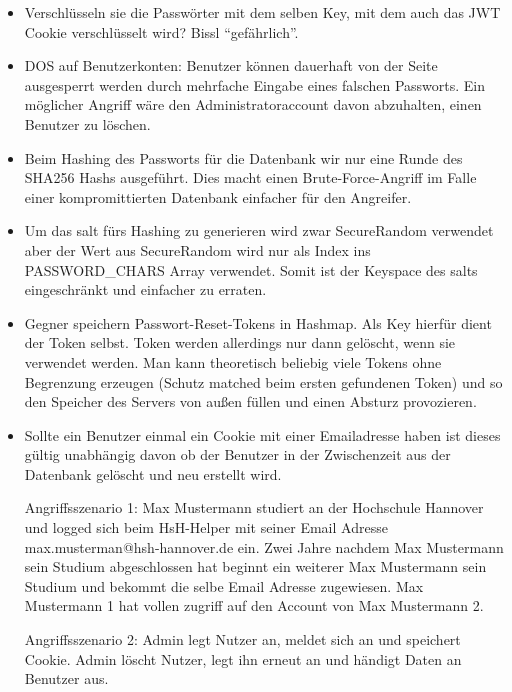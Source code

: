 \documentclass[12pt,DIV14,BCOR10mm,a4paper,parskip=half-,headsepline,headinclude,english,ngerman,bibliography=totocnumbered]{scrreprt}
\begin{document}
\begin{itemize}
  \item Verschlüsseln sie die Passwörter mit dem selben Key, mit dem auch das JWT Cookie verschlüsselt wird? Bissl \enquote{gefährlich}.
  \item DOS auf Benutzerkonten: Benutzer können dauerhaft von der Seite ausgesperrt werden durch mehrfache Eingabe eines falschen Passworts. Ein möglicher Angriff wäre den Administratoraccount davon abzuhalten, einen Benutzer zu löschen.
  \item Beim Hashing des Passworts für die Datenbank wir nur eine Runde des SHA256 Hashs ausgeführt. Dies macht einen Brute-Force-Angriff im Falle einer kompromittierten Datenbank einfacher für den Angreifer.
  \item Um das salt fürs Hashing zu generieren wird zwar SecureRandom verwendet aber der Wert aus SecureRandom wird nur als Index ins PASSWORD\_CHARS Array verwendet. Somit ist der Keyspace des salts eingeschränkt und einfacher zu erraten.
  \item Gegner speichern Passwort-Reset-Tokens in Hashmap. Als Key hierfür dient der Token selbst. Token werden allerdings nur dann gelöscht, wenn sie verwendet werden. Man kann theoretisch beliebig viele Tokens ohne Begrenzung erzeugen (Schutz matched beim ersten gefundenen Token) und so den Speicher des Servers von außen füllen und einen Absturz provozieren.
  
  \item Sollte ein Benutzer einmal ein Cookie mit einer Emailadresse haben ist dieses gültig unabhängig davon ob der Benutzer in der Zwischenzeit aus der Datenbank gelöscht und neu erstellt wird. 

Angriffsszenario 1: Max Mustermann studiert an der Hochschule Hannover und logged sich beim HsH-Helper mit seiner Email Adresse max.musterman@hsh-hannover.de ein. Zwei Jahre nachdem Max Mustermann sein Studium abgeschlossen hat beginnt ein weiterer Max Mustermann sein Studium und bekommt die selbe Email Adresse zugewiesen. Max Mustermann 1 hat vollen zugriff auf den Account von Max Mustermann 2. 

Angriffsszenario 2: Admin legt Nutzer an, meldet sich an und speichert Cookie. Admin löscht Nutzer, legt ihn erneut an und händigt Daten an Benutzer aus.
  

\end{itemize}
\end{document}
